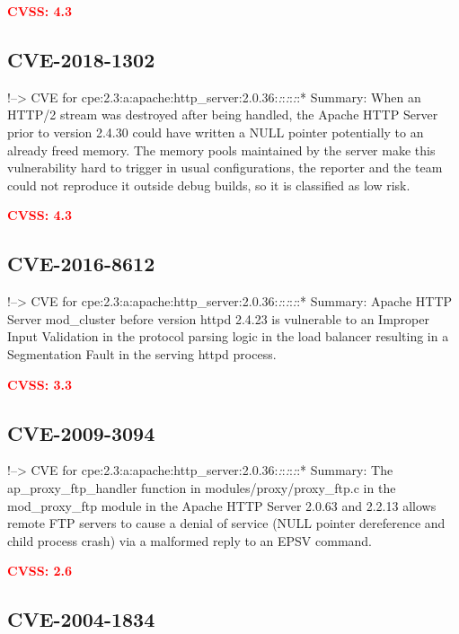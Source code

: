 \documentclass[a4paper, 12pt]{article}
\begin{document}
\textbf{\textcolor{red}{CVSS: 4.3}}

\hypertarget{cve-2018-1302}{%
\subsection{CVE-2018-1302}\label{cve-2018-1302}}

!--\textgreater{} CVE for
cpe:2.3:a:apache:http\_server:2.0.36:\emph{:}:\emph{:}:\emph{:}:*
Summary: When an HTTP/2 stream was destroyed after being handled, the
Apache HTTP Server prior to version 2.4.30 could have written a NULL
pointer potentially to an already freed memory. The memory pools
maintained by the server make this vulnerability hard to trigger in
usual configurations, the reporter and the team could not reproduce it
outside debug builds, so it is classified as low risk.

\textbf{\textcolor{red}{CVSS: 4.3}}

\hypertarget{cve-2016-8612}{%
\subsection{CVE-2016-8612}\label{cve-2016-8612}}

!--\textgreater{} CVE for
cpe:2.3:a:apache:http\_server:2.0.36:\emph{:}:\emph{:}:\emph{:}:*
Summary: Apache HTTP Server mod\_cluster before version httpd 2.4.23 is
vulnerable to an Improper Input Validation in the protocol parsing logic
in the load balancer resulting in a Segmentation Fault in the serving
httpd process.

\textbf{\textcolor{red}{CVSS: 3.3}}

\hypertarget{cve-2009-3094}{%
\subsection{CVE-2009-3094}\label{cve-2009-3094}}

!--\textgreater{} CVE for
cpe:2.3:a:apache:http\_server:2.0.36:\emph{:}:\emph{:}:\emph{:}:*
Summary: The ap\_proxy\_ftp\_handler function in
modules/proxy/proxy\_ftp.c in the mod\_proxy\_ftp module in the Apache
HTTP Server 2.0.63 and 2.2.13 allows remote FTP servers to cause a
denial of service (NULL pointer dereference and child process crash) via
a malformed reply to an EPSV command.

\textbf{\textcolor{red}{CVSS: 2.6}}

\hypertarget{cve-2004-1834}{%
\subsection{CVE-2004-1834}\label{cve-2004-1834}}
\end{document}
